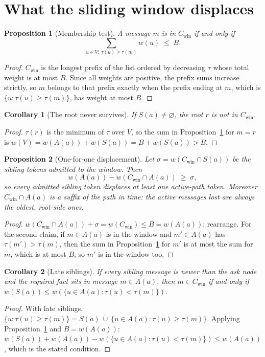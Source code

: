 \documentclass[11pt]{article}
\newtheorem{proposition}{Proposition}
\newtheorem{corollary}{Corollary}[proposition]
\theoremstyle{definition}
\theoremstyle{remark}
\newcommand{\A}{A(a)}
\newcommand{\Sib}{S(a)}
\newcommand{\w}{w}
\newcommand{\win}{\mathrm{win}}
\begin{document}
\section{What the sliding window displaces}

\begin{proposition}[Membership test]\label{prop:member}
A message $m$ is in $C_\win$ if and only if
\[
  \sum_{u\in V:\ \tau(u)\ge\tau(m)} \w(u)\;\le\;B .
\]
\end{proposition}
\begin{proof}
$C_\win$ is the longest prefix of the list ordered by decreasing $\tau$ whose
total weight is at most $B$. Since all weights are positive, the prefix sums
increase strictly, so $m$ belongs to that prefix exactly when the prefix ending
at $m$, which is $\{u:\tau(u)\ge\tau(m)\}$, has weight at most $B$.
\end{proof}

\begin{corollary}[The root never survives]\label{cor:root}
If $\Sib\neq\varnothing$, the root $r$ is not in $C_\win$.
\end{corollary}
\begin{proof}
$\tau(r)$ is the minimum of $\tau$ over $V$, so the sum in
Proposition~\ref{prop:member} for $m=r$ is
$\w(V)=\w(\A)+\w(\Sib)=B+\w(\Sib)>B$.
\end{proof}

\begin{proposition}[One-for-one displacement]\label{prop:displace}
Let $\sigma=\w(C_\win\cap\Sib)$ be the sibling tokens admitted to the window.
Then
\[
  \w(\A)-\w(C_\win\cap\A)\;\ge\;\sigma ,
\]
so every admitted sibling token displaces at least one active-path token.
Moreover $C_\win\cap\A$ is a suffix of the path in time: the active messages
lost are always the oldest, root-side ones.
\end{proposition}
\begin{proof}
$\w(C_\win\cap\A)+\sigma=\w(C_\win)\le B=\w(\A)$; rearrange. For the second
claim, if $m\in\A$ is in the window and $m'\in\A$ has $\tau(m')>\tau(m)$, then
the sum in Proposition~\ref{prop:member} for $m'$ is at most the sum for $m$,
which is at most $B$, so $m'$ is in the window too.
\end{proof}

\begin{corollary}[Late siblings]\label{cor:late}
If every sibling message is newer than the ask node and the required fact sits
in message $m\in\A$, then $m\in C_\win$ if and only if
$\w(\Sib)\le\w(\{u\in\A:\tau(u)<\tau(m)\})$.
\end{corollary}
\begin{proof}
With late siblings, $\{u:\tau(u)\ge\tau(m)\}=\Sib\ \dot\cup\ \{u\in\A:\tau(u)\ge\tau(m)\}$.
Applying Proposition~\ref{prop:member} and $B=\w(\A)$:
$\w(\Sib)+\w(\A)-\w(\{u\in\A:\tau(u)<\tau(m)\})\le\w(\A)$, which is the stated condition.
\end{proof}
\end{document}
